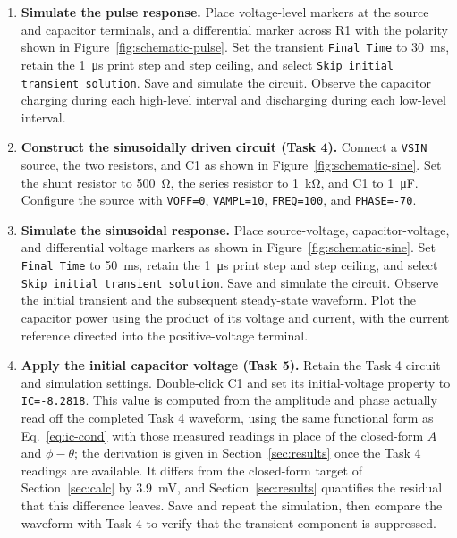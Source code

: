 \documentclass[12pt,a4paper]{article}
\begin{document}
\begin{enumerate}[label=\arabic*., leftmargin=2.5em, itemsep=6pt]
		\item \textbf{Simulate the pulse response.}
		Place voltage-level markers at the source and capacitor
		terminals, and a differential marker across R1 with the
		polarity shown in Figure~\ref{fig:schematic-pulse}.
		Set the transient \texttt{Final Time} to
		\SI{30}{\milli\second}, retain the \SI{1}{\micro\second}
		print step and step ceiling, and select
		\texttt{Skip initial transient solution}.  Save and simulate
		the circuit.  Observe the capacitor charging during each
		high-level interval and discharging during each low-level
		interval.
		
		\item \textbf{Construct the sinusoidally driven circuit (Task 4).}
		Connect a \texttt{VSIN} source, the two resistors, and C1 as
		shown in Figure~\ref{fig:schematic-sine}.  Set the shunt
		resistor to \SI{500}{\ohm}, the series resistor to
		\SI{1}{\kilo\ohm}, and C1 to \SI{1}{\micro\farad}.
		Configure the source with \texttt{VOFF=0},
		\texttt{VAMPL=10}, \texttt{FREQ=100}, and
		\texttt{PHASE=-70}.
		
		\item \textbf{Simulate the sinusoidal response.}
		Place source-voltage, capacitor-voltage, and differential
		voltage markers as shown in Figure~\ref{fig:schematic-sine}.
		Set \texttt{Final Time} to \SI{50}{\milli\second}, retain
		the \SI{1}{\micro\second} print step and step ceiling, and
		select \texttt{Skip initial transient solution}.
		Save and simulate the circuit.  Observe the initial transient
		and the subsequent steady-state waveform.  Plot the capacitor
		power using the product of its voltage and current, with the
		current reference directed into the positive-voltage terminal.
		
		\item \textbf{Apply the initial capacitor voltage (Task 5).}
		Retain the Task 4 circuit and simulation settings.
		Double-click C1 and set its initial-voltage property to
		\texttt{IC=-8.2818}.  This value is computed from the
		amplitude and phase actually read off the completed Task 4
		waveform, using the same functional form as
		Eq.~\eqref{eq:ic-cond} with those measured readings in place
		of the closed-form $A$ and $\phi-\theta$; the derivation is
		given in Section~\ref{sec:results} once the Task 4 readings
		are available.  It differs from the closed-form target of
		Section~\ref{sec:calc} by \SI{3.9}{\milli\volt}, and
		Section~\ref{sec:results} quantifies the residual that this
		difference leaves.  Save and repeat the simulation, then
		compare the waveform with Task 4 to verify that the transient
		component is suppressed.
		

\end{enumerate}
\end{document}
